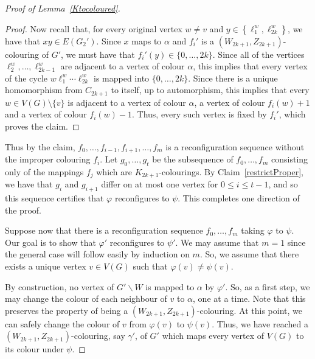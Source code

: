 \documentclass[11 pt]{amsart}
\theoremstyle{definition}
\theoremstyle{case}
\numberwithin{equation}{section}
\begin{document}
\begin{proof}[Proof of Lemma~\ref{Ktocoloured}]
\begin{proof}
Now recall that, for every original vertex $w\neq v$ and $y\in \left\{\ell_1^w,\ell_{2k}^w\right\}$, we have that $xy\in E(G_2')$. Since $x$ maps to $\alpha$ and $f_i'$ is a $(W_{2k+1},Z_{2k+1})$-colouring of $G'$, we must have that $f_i'(y)\in \{0,\dots,2k\}$. Since all of the vertices $\ell_2^w,\dots,\ell_{2k-1}^w$ are adjacent to a vertex of colour $\alpha$, this implies that every vertex of the cycle $w\ell_1^w\cdots \ell_{2k}^w$ is mapped into $\{0,\dots,2k\}$. Since there is a unique homomorphism from $C_{2k+1}$ to itself, up to automorphism, this implies that every $w\in V(G)\setminus\{v\}$ is adjacent to a vertex of colour $\alpha$, a vertex of colour $f_i(w)+1$ and a vertex of colour $f_i(w)-1$. Thus, every such vertex is fixed by $f_i'$, which proves the claim. 
\end{proof}

Thus by the claim, $f_0, \dots, f_{i-1}, f_{i+1}, \dots, f_m$ is a reconfiguration sequence without the improper colouring $f_i$. Let  $g_0,\dots,g_t$ be the subsequence of $f_0,\dots,f_m$ consisting only of the mappings $f_j$ which are $K_{2k+1}$-colourings. By Claim~\ref{restrictProper}, we have that $g_i$ and $g_{i+1}$ differ on at most one vertex for $0\leq i\leq t-1$, and so this sequence certifies that $\varphi$ reconfigures to $\psi$. This completes one direction of the proof. 

Suppose now that there is a reconfiguration sequence $f_0,\dots, f_m$ taking $\varphi$ to $\psi$. Our goal is to show that $\varphi'$ reconfigures to $\psi'$.  We may assume that $m=1$ since the general case will follow easily by induction on $m$. So, we assume that there exists a unique vertex $v\in V(G)$ such that $\varphi(v)\neq \psi(v)$. 

By construction, no vertex of $G' \backslash W$ is mapped to $\alpha$ by $\varphi'$. So, as a first step, we may change the colour of each neighbour of $v$ to $\alpha$, one at a time. Note that this preserves the property of being a $(W_{2k+1},Z_{2k+1})$-colouring. At this point, we can safely change the colour of $v$ from $\varphi(v)$ to $\psi(v)$. Thus, we have reached a $(W_{2k+1},Z_{2k+1})$-colouring, say $\gamma'$, of $G'$ which maps every vertex of $V(G)$ to its colour under $\psi$. 


\end{proof}
\end{document}
